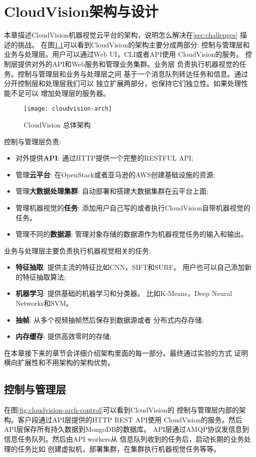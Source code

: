 \chapter{CloudVision架构与设计}
\label{cha:architecture}
本章描述CloudVision机器视觉云平台的架构，说明怎么解决在\ref{sec:challenges}
描述的挑战。
在图\ref{fig:cloudvision-arch}可以看到CloudVision的架构主要分成两部分:
控制与管理层和业务与处理层。用户可以通过Web UI，CLI或者API使用
CloudVision的服务。 控制层提供对外的API和Web服务和管理业务集群。业务层
负责执行机器视觉的任务。控制与管理层和业务与处理层之间
基于一个消息队列转达任务和信息。通过分开控制层和处理层我们可以
独立扩展两部分，也保持它们独立性。如果处理性能不足可以
增加处理层的服务器。
\begin{figure}[H]
  \centering
  \texttt{[image: cloudvision-arch]}
  \caption{CloudVision 总体架构}
  \label{fig:cloudvision-arch}
\end{figure}

控制与管理层负责:
\begin{itemize}
  \item 对外提供\textbf{API}: 通过HTTP提供一个完整的RESTFUL API;
  \item 管理\textbf{云平台}: 在OpenStack或者亚马逊的AWS创建基础设施的资源;
  \item 管理\textbf{大数据处理集群}: 自动部署和搭建大数据集群在云平台上面;
  \item 管理机器视觉的\textbf{任务}: 添加用户自己写的或者执行CloudVision自带机器视觉的任务。
  \item 管理不同的\textbf{数据源}: 管理对象存储的数据源作为机器视觉任务的输入和输出。
\end{itemize}
业务与处理层主要负责执行机器视觉相关的任务:
\begin{itemize}
  \item \textbf{特征抽取}: 提供主流的特征比如CNN，SIFT和SURF。
        用户也可以自己添加新的特征抽取算法;
  \item \textbf{机器学习}: 提供基础的机器学习和分类器。
        比如K-Means，Deep Neural Networks和SVM。
  \item \textbf{抽帧}: 从多个视频抽帧然后保存到数据源或者
        分布式内存存储;
  \item \textbf{内存缓存}: 提供高效零时的存储;
\end{itemize}

在本章接下来的章节会详细介绍架构里面的每一部分。最终通过实验的方式
证明横向扩展性和不用架构的架构优势。


\section{控制与管理层}
\label{sec:arch_control}
在图\ref{fig:cloudvision-arch-control}可以看到CloudVision的
控制与管理层内部的架构。客户段通过API层提供的HTTP REST API使用
CloudVision的服务。然后API层保存所有持久数据到MongoDB的数据库。
API层通过AMQP协议发信息到信息任务队列。然后由API workers从
信息队列收到的任务后，启动长期的业务处理的任务比如
创建虚拟机，部署集群，在集群执行机器视觉任务等等。

